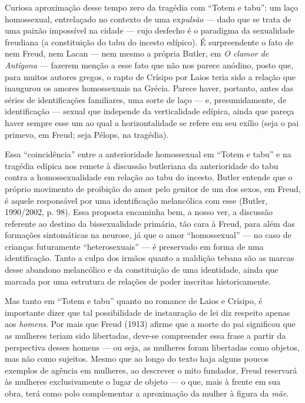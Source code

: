 Curiosa aproximação desse tempo zero da tragédia com ``Totem e tabu'':
um laço homossexual, entrelaçado no contexto de uma ex\emph{pulsão} ---
dado que se trata de uma paixão impossível na cidade --- cujo desfecho é
o paradigma da sexualidade freudiana (a constituição do tabu do incesto
edípico). É surpreendente o fato de nem Freud, nem Lacan --- nem mesmo a
própria Butler, em \emph{O clamor de Antígona} --- fazerem menção a esse
fato que não nos parece anódino, posto que, para muitos autores gregos,
o rapto de Crísipo por Laios teria sido a relação que inaugurou os
amores homossexuais na Grécia. Parece haver, portanto, antes das séries
de identificações familiares, uma sorte de laço --- e, presumidamente,
de identificação --- sexual que independe da verticalidade edípica,
ainda que pareça haver sempre esse um ao qual a horizontalidade se
refere em seu exílio (seja o pai primevo, em Freud; seja Pélops, na
tragédia).

Essa ``coincidência'' entre a anterioridade homossexual em ``Totem e
tabu'' e na tragédia edípica nos remete à discussão butleriana da
anterioridade do tabu contra a homossexualidade em relação ao tabu do
incesto. Butler entende que o próprio movimento de proibição do amor
pelo genitor de um dos sexos, em Freud, é aquele responsável por uma
identificação melancólica com esse (Butler, 1990/2002, p. 98). Essa
proposta encaminha bem, a nosso ver, a discussão referente ao destino da
bissexualidade primária, tão cara à Freud, para além das formações
sintomáticas na neurose, já que o amor ``homossexual'' --- no caso de
crianças futuramente ``heterosexuais'' --- é preservado em forma de uma
identificação. Tanto a culpa dos irmãos quanto a maldição tebana são as
marcas desse abandono melancólico e da constituição de uma identidade,
ainda que marcada por uma estrutura de relações de poder inscritas
historicamente.

Mas tanto em ``Totem e tabu'' quanto no romance de Laios e Crísipo, é
importante dizer que tal possibilidade de instauração de lei diz
respeito apenas aos \emph{homens}. Por mais que Freud (1913) afirme que
a morte do pai significou que as mulheres teriam sido libertadas,
deve-se compreender essa frase a partir da perspectiva desses homens ---
ou seja, as mulheres foram libertadas como objetos, mas não como
sujeitos. Mesmo que ao longo do texto haja alguns poucos exemplos de
agência em mulheres, ao descrever o mito fundador, Freud reservará às
mulheres exclusivamente o lugar de objeto --- o que, mais à frente em
sua obra, terá como polo complementar a aproximação da mulher à figura
da \emph{mãe}.

